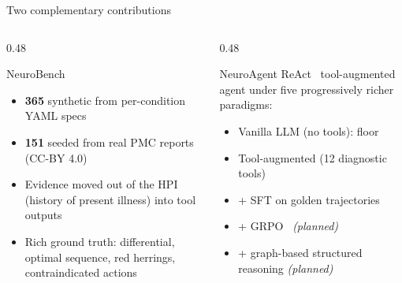 \documentclass[aspectratio=169,t]{beamer}
\begin{document}
\begin{frame}{Two complementary contributions}
  \begin{columns}[T,onlytextwidth]
    \begin{column}{0.48\textwidth}
      \begin{block}{NeuroBench}
        \footnotesize
        \begin{itemize}\setlength\itemsep{0.1em}
          \item \textbf{365} synthetic from per-condition YAML specs
          \item \textbf{151} seeded from real PMC reports
                (CC-BY 4.0)~\cite{wu2025medcasereasoning,zhao2022pmcpatients}
          \item Evidence moved out of the HPI (history of present
                illness) into \alert{tool outputs}
          \item Rich ground truth: differential, optimal sequence,
                red herrings, contraindicated actions
        \end{itemize}
      \end{block}
    \end{column}%
    \hfill
    \begin{column}{0.48\textwidth}
      \begin{exampleblock}{NeuroAgent}
        ReAct~\cite{yao2023react} tool-augmented agent under five
        progressively richer paradigms:
        \begin{itemize}\setlength\itemsep{0.1em}
          \item Vanilla LLM (no tools): floor
          \item Tool-augmented (12 diagnostic tools)
          \item + SFT on golden trajectories
          \item + GRPO~\cite{shao2024grpo} \emph{(planned)}
          \item + graph-based structured reasoning \emph{(planned)}
        \end{itemize}
      \end{exampleblock}
    \end{column}
  \end{columns}

  \vspace{1mm}
\end{frame}
\end{document}
